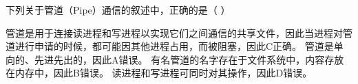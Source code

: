 \question 下列关于管道（Pipe）通信的叙述中，正确的是（ ）
\par{}
\begin{solution}管道是用于连接读进程和写进程以实现它们之间通信的共享文件，因此当进程对管道进行申请的时候，都可能因其他进程占用，而被阻塞，因此C正确。
管道是单向的、先进先出的，因此A错误。
有名管道的名字存在于文件系统中，内容存放在内存中，因此B错误。
读进程和写进程可同时对其操作，因此D错误。
\end{solution}

